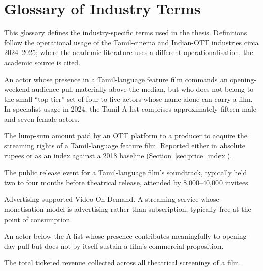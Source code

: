 \chapter{Glossary of Industry Terms}
\label{app:glossary}

\noindent
This glossary defines the industry-specific terms used in the
thesis.  Definitions follow the operational usage of the
Tamil-cinema and Indian-OTT industries circa 2024--2025; where the
academic literature uses a different operationalisation, the
academic source is cited.

\begin{description}[style=nextline,leftmargin=2.4em]
\item[A-list star.]  An actor whose presence in a Tamil-language
        feature film commands an opening-weekend audience pull
        materially above the median, but who does not belong to the
        small ``top-tier'' set of four to five actors whose name
        alone can carry a film.  In specialist usage in 2024, the
        Tamil A-list comprises approximately fifteen male and seven
        female actors.

\item[Acquisition price.]  The lump-sum amount paid by an OTT
        platform to a producer to acquire the streaming rights of
        a Tamil-language feature film.  Reported either in absolute
        rupees or as an index against a 2018 baseline
        (Section~\ref{sec:price_index}).

\item[Audio launch.]  The public release event for a Tamil-language
        film's soundtrack, typically held two to four months before
        theatrical release, attended by 8{,}000--40{,}000 invitees.

\item[AVOD.]  Advertising-supported Video On Demand.  A streaming
        service whose monetisation model is advertising rather than
        subscription, typically free at the point of consumption.

\item[B-list star.]  An actor below the A-list whose presence
        contributes meaningfully to opening-day pull but does not by
        itself sustain a film's commercial proposition.

\item[Box-office gross.]  The total ticketed revenue collected
        across all theatrical screenings of a film.


\end{description}
